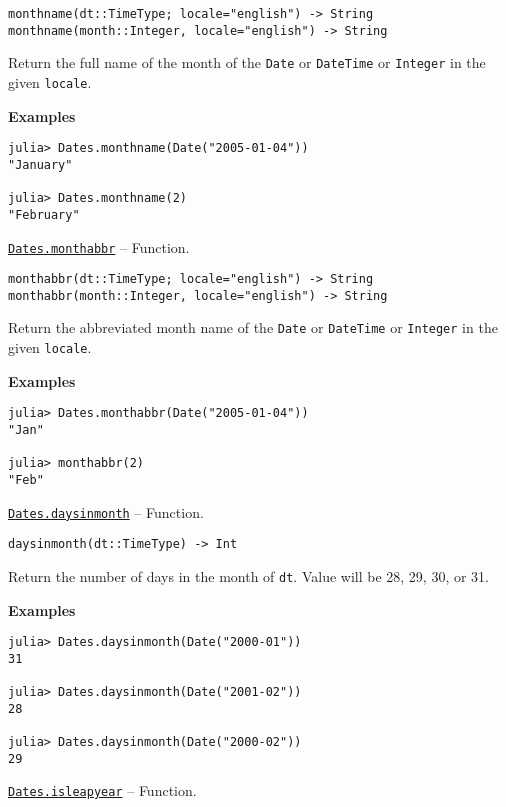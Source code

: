 \begin{adjustwidth}{2em}{0pt}


\begin{verbatim}
monthname(dt::TimeType; locale="english") -> String
monthname(month::Integer, locale="english") -> String
\end{verbatim}

Return the full name of the month of the \texttt{Date} or \texttt{DateTime} or \texttt{Integer} in the given \texttt{locale}.

\textbf{Examples}


\begin{verbatim}
julia> Dates.monthname(Date("2005-01-04"))
"January"

julia> Dates.monthname(2)
"February"
\end{verbatim}



\end{adjustwidth}
\hypertarget{12804940912944832895}{}
\hyperlink{12804940912944832895}{\texttt{Dates.monthabbr}}  -- {Function.}

\begin{adjustwidth}{2em}{0pt}


\begin{verbatim}
monthabbr(dt::TimeType; locale="english") -> String
monthabbr(month::Integer, locale="english") -> String
\end{verbatim}

Return the abbreviated month name of the \texttt{Date} or \texttt{DateTime} or \texttt{Integer} in the given \texttt{locale}.

\textbf{Examples}


\begin{verbatim}
julia> Dates.monthabbr(Date("2005-01-04"))
"Jan"

julia> monthabbr(2)
"Feb"
\end{verbatim}



\end{adjustwidth}
\hypertarget{7867088328366678414}{}
\hyperlink{7867088328366678414}{\texttt{Dates.daysinmonth}}  -- {Function.}

\begin{adjustwidth}{2em}{0pt}


\begin{verbatim}
daysinmonth(dt::TimeType) -> Int
\end{verbatim}

Return the number of days in the month of \texttt{dt}. Value will be 28, 29, 30, or 31.

\textbf{Examples}


\begin{verbatim}
julia> Dates.daysinmonth(Date("2000-01"))
31

julia> Dates.daysinmonth(Date("2001-02"))
28

julia> Dates.daysinmonth(Date("2000-02"))
29
\end{verbatim}



\end{adjustwidth}
\hypertarget{8386083064240039655}{}
\hyperlink{8386083064240039655}{\texttt{Dates.isleapyear}}  -- {Function.}

